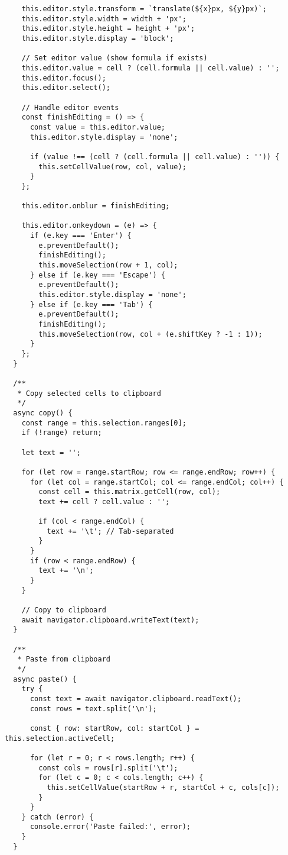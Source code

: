 \documentclass[11pt]{article}
\begin{document}
\begin{verbatim}
    this.editor.style.transform = `translate(${x}px, ${y}px)`;
    this.editor.style.width = width + 'px';
    this.editor.style.height = height + 'px';
    this.editor.style.display = 'block';
    
    // Set editor value (show formula if exists)
    this.editor.value = cell ? (cell.formula || cell.value) : '';
    this.editor.focus();
    this.editor.select();
    
    // Handle editor events
    const finishEditing = () => {
      const value = this.editor.value;
      this.editor.style.display = 'none';
      
      if (value !== (cell ? (cell.formula || cell.value) : '')) {
        this.setCellValue(row, col, value);
      }
    };
    
    this.editor.onblur = finishEditing;
    
    this.editor.onkeydown = (e) => {
      if (e.key === 'Enter') {
        e.preventDefault();
        finishEditing();
        this.moveSelection(row + 1, col);
      } else if (e.key === 'Escape') {
        e.preventDefault();
        this.editor.style.display = 'none';
      } else if (e.key === 'Tab') {
        e.preventDefault();
        finishEditing();
        this.moveSelection(row, col + (e.shiftKey ? -1 : 1));
      }
    };
  }
  
  /**
   * Copy selected cells to clipboard
   */
  async copy() {
    const range = this.selection.ranges[0];
    if (!range) return;
    
    let text = '';
    
    for (let row = range.startRow; row <= range.endRow; row++) {
      for (let col = range.startCol; col <= range.endCol; col++) {
        const cell = this.matrix.getCell(row, col);
        text += cell ? cell.value : '';
        
        if (col < range.endCol) {
          text += '\t'; // Tab-separated
        }
      }
      if (row < range.endRow) {
        text += '\n';
      }
    }
    
    // Copy to clipboard
    await navigator.clipboard.writeText(text);
  }
  
  /**
   * Paste from clipboard
   */
  async paste() {
    try {
      const text = await navigator.clipboard.readText();
      const rows = text.split('\n');
      
      const { row: startRow, col: startCol } = this.selection.activeCell;
      
      for (let r = 0; r < rows.length; r++) {
        const cols = rows[r].split('\t');
        for (let c = 0; c < cols.length; c++) {
          this.setCellValue(startRow + r, startCol + c, cols[c]);
        }
      }
    } catch (error) {
      console.error('Paste failed:', error);
    }
  }
  

\end{verbatim}
\end{document}
